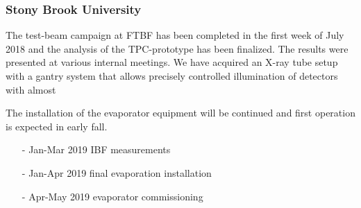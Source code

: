 \subsubsection{Stony Brook University} 
The test-beam campaign at FTBF has been completed in the first week of July 2018 and the analysis of the TPC-prototype has been finalized. The results were presented at various internal meetings.\newline
We have acquired an X-ray tube setup with a gantry system that allows precisely controlled illumination of detectors with almost 

The installation of the evaporator equipment will be continued and first operation is expected in early fall.
\begin{itemize}
\item[-] Jan-Mar 2019 IBF measurements
\item[-] Jan-Apr 2019 final evaporation installation
\item[-] Apr-May 2019 evaporator commissioning
\end{itemize}